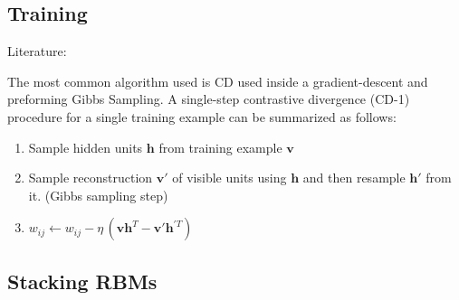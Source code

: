 \subsection{Training}
Literature: \cite{Hinton2012}


The most common algorithm used is \gls{CD} used inside a gradient-descent and preforming Gibbs Sampling. A single-step contrastive divergence (CD-1) procedure for a single training example can be summarized as follows:
\begin{enumerate}

\item Sample hidden units $\mathbf{h}$ from training example $\mathbf{v}$
\item Sample reconstruction $\mathbf{v}'$ of visible units using $\mathbf{h}$ and then resample $\mathbf{h}'$ from it. (Gibbs sampling step)
\item $w_{ij} \leftarrow w_{ij} - \eta\, (\mathbf{v} \mathbf{h}^T - \mathbf{v}' \mathbf{h}^{'T})$
\end{enumerate}

\subsection{Stacking RBMs}